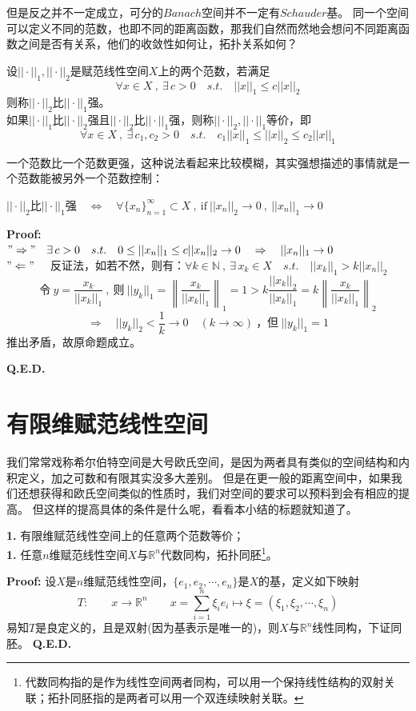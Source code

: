 但是反之并不一定成立，可分的$Banach$空间并不一定有$Schauder$基。
\vspace{0.5cm}
同一个空间可以定义不同的范数，也即不同的距离函数，那我们自然而然地会想问不同距离函数之间是否有关系，他们的收敛性如何让，拓扑关系如何？
\begin{definition}[等价范数]
    设$||\cdot||_1,||\cdot||_2$是赋范线性空间$X$上的两个范数，若满足
    \[\forall x \in X \ , \ \exists \, c>0 \quad s.t. \quad ||x||_1 \leq c||x||_2\]
    则称$||\cdot||_2$比$||\cdot||_1$强。\\
    如果$||\cdot||_1$比$||\cdot||_2$强且$||\cdot||_2$比$||\cdot||_1$强，则称$||\cdot||_2,||\cdot||_1$等价，即
    \[\forall x \in X \ , \ \exists \, c_1,c_2>0 \quad s.t. \quad c_1||x||_1 \leq ||x||_2 \leq c_2||x||_1\]
\end{definition}
一个范数比一个范数更强，这种说法看起来比较模糊，其实强想描述的事情就是一个范数能被另外一个范数控制：
\begin{theorem}
    $||\cdot||_2$比$||\cdot||_1$强$ \quad \Leftrightarrow \quad \forall \{x_n\}_{n=1}^{\infty} \subset X \ , \ \text{if} \ ||x_n||_2 \to 0 \ , \ ||x_n||_1 \to 0$
\end{theorem}
\textbf{Proof:}\\
$"\Rightarrow" \quad \exists \, c>0 \quad s.t. \quad 0 \leq ||x_n||_1 \leq c||x_n||_2 \to 0 \quad \Rightarrow \quad ||x_n||_1 \to 0$\\
$"\Leftarrow" \quad$ 反证法，如若不然，则有：$\forall k \in \mathbb{N} \ , \ \exists \, x_k \in X \quad s.t. \quad ||x_k||_1>k||x_n||_2$\\
\[\text{令} \ y=\frac{x_k}{||x_k||_1} \ , \ \text{则} \ ||y_k||_1=\left\|\frac{x_k}{||x_k||_1}\right\|_1=1>k\frac{||x_k||_2}{||x_k||_1}=k\left\|\frac{x_k}{||x_k||_1}\right\|_2\]
\[\Rightarrow \quad ||y_k||_2<\frac{1}{k} \to 0 \quad (k \to \infty) \ \text{，但} \ ||y_k||_1=1\]
推出矛盾，故原命题成立。

\textbf{Q.E.D.}

\section{有限维赋范线性空间}
我们常常戏称希尔伯特空间是大号欧氏空间，是因为两者具有类似的空间结构和内积定义，加之可数和有限其实没多大差别。
但是在更一般的距离空间中，如果我们还想获得和欧氏空间类似的性质时，我们对空间的要求可以预料到会有相应的提高。
但这样的提高具体的条件是什么呢，看看本小结的标题就知道了。
\begin{theorem}\label{the:B}
    \textbf{1.} \quad 有限维赋范线性空间上的任意两个范数等价；\\
    \textbf{1.} \quad 任意$n$维赋范线性空间$X$与$\mathbb{R}^n$代数同构，拓扑同胚\footnote{代数同构指的是作为线性空间两者同构，可以用一个保持线性结构的双射关联；拓扑同胚指的是两者可以用一个双连续映射关联。}。
\end{theorem}
\textbf{Proof:} \quad 设$X$是$n$维赋范线性空间，$\{e_1,e_2,\cdots,e_n\}$是$X$的基，定义如下映射
\[T: \qquad x \to \mathbb{R}^n \qquad x=\sum_{i=1}^n\xi_ie_i \mapsto \xi=(\xi_1,\xi_2,\cdots,\xi_n)\]
易知$T$是良定义的，且是双射(因为基表示是唯一的)，则$X$与$\mathbb{R}^n$线性同构，下证同胚。
\textbf{Q.E.D.}